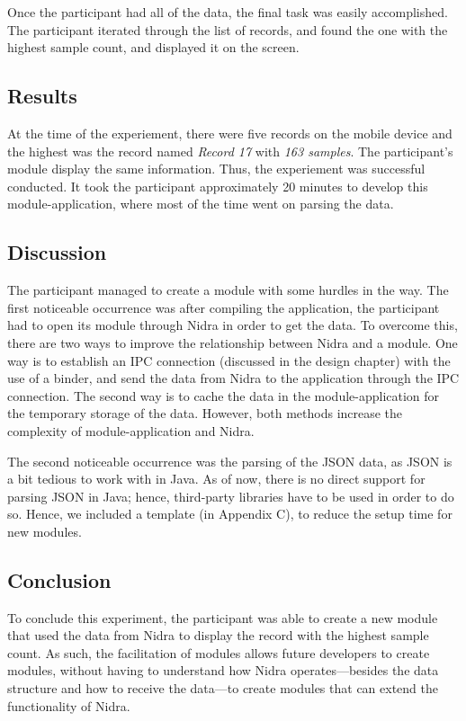 Once the participant had all of the data, the final task was easily accomplished. The participant iterated through the list of records, and found the one with the highest sample count, and displayed it on the screen. 

\subsection{Results}

At the time of the experiement, there were five records on the mobile device and the highest was the record named \textit{Record 17} with \textit{163 samples}. The participant's module display the same information. Thus, the experiement was successful conducted. It took the participant approximately 20 minutes to develop this module-application, where most of the time went on parsing the data.

\subsection{Discussion}

The participant managed to create a module with some hurdles in the way. The first noticeable occurrence was after compiling the application, the participant had to open its module through Nidra in order to get the data. To overcome this, there are two ways to improve the relationship between Nidra and a module. One way is to establish an IPC connection (discussed in the design chapter) with the use of a binder, and send the data from Nidra to the application through the IPC connection. The second way is to cache the data in the module-application for the temporary storage of the data. However, both methods increase the complexity of module-application and Nidra. 

The second noticeable occurrence was the parsing of the JSON data, as JSON is a bit tedious to work with in Java. As of now, there is no direct support for parsing JSON in Java; hence, third-party libraries have to be used in order to do so. Hence, we included a template (in Appendix C), to reduce the setup time for new modules.

\subsection{Conclusion}

To conclude this experiment, the participant was able to create a new module that used the data from Nidra to display the record with the highest sample count. As such, the facilitation of modules allows future developers to create modules, without having to understand how Nidra operates---besides the data structure and how to receive the data---to create modules that can extend the functionality of Nidra.

